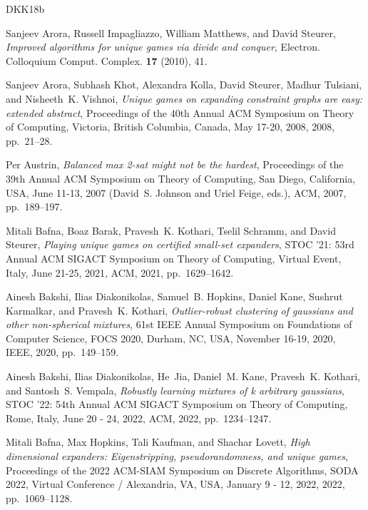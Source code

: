 \documentclass[11pt]{article}
\theoremstyle{definition}
\begin{document}
\begin{thebibliography}{DKK{\etalchar{+}}18b}

Sanjeev Arora, Russell Impagliazzo, William Matthews, and David Steurer,
  \emph{Improved algorithms for unique games via divide and conquer}, Electron.
  Colloquium Comput. Complex. \textbf{17} (2010), 41.

Sanjeev Arora, Subhash Khot, Alexandra Kolla, David Steurer, Madhur Tulsiani,
  and Nisheeth~K. Vishnoi, \emph{Unique games on expanding constraint graphs
  are easy: extended abstract}, Proceedings of the 40th Annual {ACM} Symposium
  on Theory of Computing, Victoria, British Columbia, Canada, May 17-20, 2008,
  2008, pp.~21--28.

Per Austrin, \emph{Balanced max 2-sat might not be the hardest}, Proceedings of
  the 39th Annual {ACM} Symposium on Theory of Computing, San Diego,
  California, USA, June 11-13, 2007 (David~S. Johnson and Uriel Feige, eds.),
  {ACM}, 2007, pp.~189--197.

Mitali Bafna, Boaz Barak, Pravesh~K. Kothari, Tselil Schramm, and David
  Steurer, \emph{Playing unique games on certified small-set expanders}, {STOC}
  '21: 53rd Annual {ACM} {SIGACT} Symposium on Theory of Computing, Virtual
  Event, Italy, June 21-25, 2021, {ACM}, 2021, pp.~1629--1642.

Ainesh Bakshi, Ilias Diakonikolas, Samuel~B. Hopkins, Daniel Kane, Sushrut
  Karmalkar, and Pravesh~K. Kothari, \emph{Outlier-robust clustering of
  gaussians and other non-spherical mixtures}, 61st {IEEE} Annual Symposium on
  Foundations of Computer Science, {FOCS} 2020, Durham, NC, USA, November
  16-19, 2020, {IEEE}, 2020, pp.~149--159.

Ainesh Bakshi, Ilias Diakonikolas, He~Jia, Daniel~M. Kane, Pravesh~K. Kothari,
  and Santosh~S. Vempala, \emph{Robustly learning mixtures of \emph{k}
  arbitrary gaussians}, {STOC} '22: 54th Annual {ACM} {SIGACT} Symposium on
  Theory of Computing, Rome, Italy, June 20 - 24, 2022, {ACM}, 2022,
  pp.~1234--1247.

Mitali Bafna, Max Hopkins, Tali Kaufman, and Shachar Lovett, \emph{High
  dimensional expanders: Eigenstripping, pseudorandomness, and unique games},
  Proceedings of the 2022 {ACM-SIAM} Symposium on Discrete Algorithms, {SODA}
  2022, Virtual Conference / Alexandria, VA, USA, January 9 - 12, 2022, 2022,
  pp.~1069--1128.


\end{thebibliography}
\end{document}
